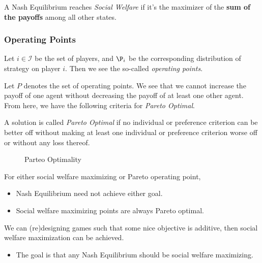 \begin{definition}
	A Nash Equilibrium reaches \emph{Social Welfare} if it's the maximizer of the \textbf{sum of the payoffs} among all other states.
\end{definition}


\subsubsection{Operating Points}
Let \(i\in \mathcal{I} \) be the set of players, and \(\P_{i}\) be the corresponding distribution of strategy on player \(i\). Then we see the
so-called \emph{operating points}.

\begin{figure}[H]
	\centering
	\label{fig:NE-social-welfare}
\end{figure}

Let \(P\) denotes the set of operating points. We see that we cannot increase the payoff of one agent without decreasing the payoff of at least
one other agent. From here, we have the following criteria for \emph{Pareto Optimal}.

\begin{definition}
	A solution is called \emph{Pareto Optimal} if no individual or preference criterion can be better off without making at least one
	individual or preference criterion worse off or without any loss thereof.
\end{definition}

\begin{figure}[H]
	\centering
	\caption{Parteo Optimality}
	\label{fig:Pareto-Optimal}
\end{figure}

\begin{note}
	For either social welfare maximizing or Pareto operating point,
	\begin{itemize}
		\item Nash Equilibrium need not achieve either goal.
		\item Social welfare maximizing points are always Pareto optimal.
	\end{itemize}
\end{note}

\begin{remark}
	We can (re)designing games such that some nice objective is additive, then social welfare maximization can be achieved.
	\begin{itemize}
		\item The goal is that any Nash Equilibrium should be social welfare maximizing.
	\end{itemize}
\end{remark}

